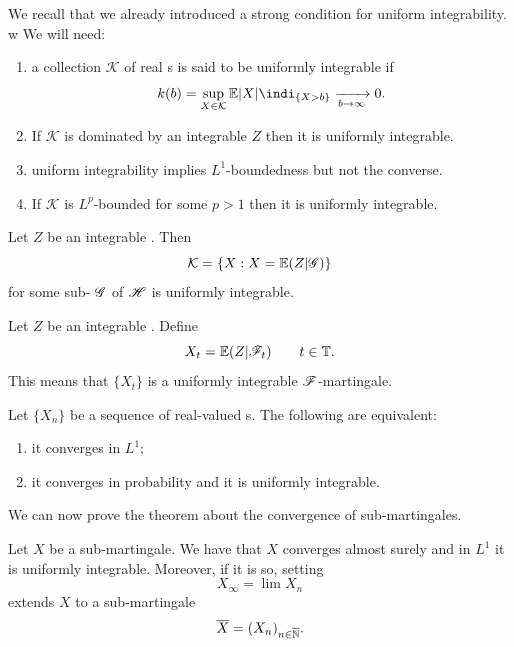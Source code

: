 \documentclass{report}
\begin{document}
We recall that we already introduced a strong condition for uniform integrability. w
We will need:
\begin{enumerate}
	\item a collection $\mathcal{K}$ of real \rv s is said to be uniformly integrable if 
	\begin{equation*}
		k(b)=\sup_{X\in\mathcal{K}}\ev|X|\indi_{\{X>b\}}\xrightarrow[b\to\infty]{}0.
	\end{equation*}
	\item If $\mathcal{K}$ is dominated by an integrable \rv{} $Z$ then it is uniformly integrable.
	\item uniform integrability implies $L^{1}$-boundedness but not the converse.
	\item If $\mathcal{K}$ is $L^{p}$-bounded for some $p>1$ then it is uniformly integrable.
\end{enumerate}
\begin{lemma}
	Let $Z$ be an integrable \rv{}. Then
	\begin{equation*}
		\mathcal{K}=\left\{X:X=\mathbb{E}(Z|\mathscr{G})\right\}
	\end{equation*}
	for some sub-\sa{} $\mathscr{G}$ of $\mathscr{H}$ is uniformly integrable.
\end{lemma}
\begin{proposition}
	Let $Z$ be an integrable \rv{}. Define 
	\begin{equation*}
		X_{t}=\mathbb{E}(Z|\mathscr{F}_{t})\qquad t\in\mathbb{T}.
	\end{equation*}
	This means that $\{X_{t}\}$ is a uniformly integrable $\mathscr{F}$-martingale.
\end{proposition}
\begin{theorem}
	Let $\{X_{n}\}$ be a sequence of real-valued \rv s. The following are equivalent:
	\begin{enumerate}
		\item it converges in $L^{1}$;
		\item it converges in probability and it is uniformly integrable.
	\end{enumerate}
\end{theorem}
We can now prove the theorem about the convergence of sub-martingales.
\begin{theorem}
	Let $X$ be a sub-martingale. We have that $X$ converges almost surely and in $L^{1}$ \ifonly{} it is uniformly integrable. Moreover, if it is so, setting 
	\begin{equation*}
		X_{\infty}=\lim X_{n}
	\end{equation*}
	extends $X$ to a sub-martingale
	\begin{equation*}
		\overline{X}={(X_{n})}_{n\in\overline{\mathbb{N}}}.
	\end{equation*}
\end{theorem}
\end{document}
